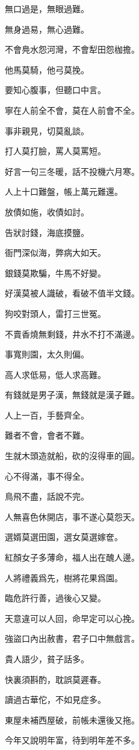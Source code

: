 \documentclass[12pt,a4paper]{ctexbook}
\begin{document}
無口過是，無眼過難。\par
無身過易，無心過難。\par
不會鳧水怨河灣，不會犁田怨枷擔。\par
他馬莫騎，他弓莫挽。\par
要知心腹事，但聽口中言。\par
寧在人前全不會，莫在人前會不全。\par
事非親見，切莫亂談。\par
打人莫打臉，罵人莫罵短。\par
好言一句三冬暖，話不投機六月寒。\par
人上十口難盤，帳上萬元難還。\par
放債如施，收債如討。\par
告狀討錢，海底摸鹽。\par
衙門深似海，弊病大如天。\par
銀錢莫欺騙，牛馬不好變。\par
好漢莫被人識破，看破不值半文錢。\par
狗咬對頭人，雷打三世冤。\par
不賣香燒無剩錢，井水不打不滿邊。\par
事寬則園，太久則偏。\par
高人求低易，低人求高難。\par
有錢就是男子漢，無錢就是漢子難。\par
人上一百，手藝齊全。\par
難者不會，會者不難。\par
生就木頭造就船，砍的沒得車的圓。\par
心不得滿，事不得全。\par
鳥飛不盡，話說不完。\par
人無喜色休開店，事不遂心莫怨天。\par
選婿莫選田園，選女莫選嫁奩。\par
紅顏女子多薄命，福人出在醜人邊。\par
人將禮義爲先，樹將花果爲園。\par
臨危許行善，過後心又變。\par
天意違可以人回，命早定可以心挽。\par
強盜口內出赦書，君子口中無戲言。\par
貴人語少，貧子話多。\par
快裏須斟酌，耽誤莫遲春。\par
讀過古華佗，不如見症多。\par
東屋未補西屋破，前帳未還後又拖。\par
今年又說明年富，待到明年差不多。\par
\end{document}
